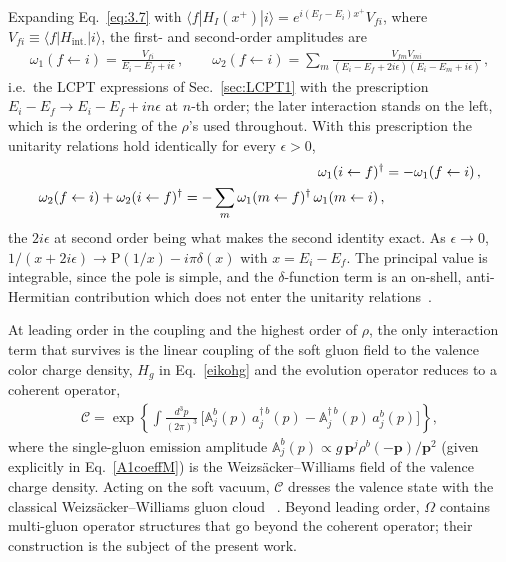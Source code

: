 \documentclass[a4paper,11pt]{article}
\def\mf#1{\mathbb{#1}}
\begin{document}
{\color{chg}Expanding Eq.~\eqref{eq:3.7} with $\langle f|H_{I}(x^{+})|i\rangle=e^{i(E_{f}-E_{i})x^{+}}V_{fi}$, where $V_{fi}\equiv\langle f|H_{\text{int.}}|i\rangle$, the first- and second-order amplitudes are
\begin{align}\label{eq:ieps}
\omega_{1}(f\leftarrow i)=\frac{V_{fi}}{E_{i}-E_{f}+i\epsilon}\,,\qquad
\omega_{2}(f\leftarrow i)=\sum_{m}\frac{V_{fm}V_{mi}}{(E_{i}-E_{f}+2i\epsilon)(E_{i}-E_{m}+i\epsilon)}\,,
\end{align}
i.e.\ the LCPT expressions of Sec.~\ref{sec:LCPT1} with the prescription $E_{i}-E_{f}\rightarrow E_{i}-E_{f}+in\epsilon$ at $n$-th order; the later interaction stands on the left, which is the ordering of the $\rho$'s used throughout. With this prescription the unitarity relations hold identically for every $\epsilon>0$,
\begin{align}
\omega_{1}(i\leftarrow f)^{\dagger}&=-\omega_{1}(f\leftarrow i)\,,\notag\\
\omega_{2}(f\leftarrow i)+\omega_{2}(i\leftarrow f)^{\dagger}=-\sum_{m}\omega_{1}(m\leftarrow f)^{\dagger}\,\omega_{1}(m\leftarrow i)\,,
\end{align}
the $2i\epsilon$ at second order being what makes the second identity exact. As $\epsilon\rightarrow0$, $1/(x+2i\epsilon)\rightarrow\mathrm{P}(1/x)-i\pi\delta(x)$ with $x=E_{i}-E_{f}$. The principal value is integrable, since the pole is simple, and the $\delta$-function term is an on-shell, anti-Hermitian contribution which does not enter the unitarity relations~\cite{munier2026unitary}.}


At leading order in the coupling and the highest order of $\rho$, the only interaction term that survives is the linear coupling of the soft gluon field to the valence color charge density, $H_{g}$ in Eq.~\eqref{eikohg} and the evolution operator reduces to a coherent operator,
\begin{align}\label{eq:coherentC}
\mathcal{C} = \exp\left\{\int \frac{d^{3}p}{(2\pi)^{3}}\,\Big[\mf{A}^{b}_{j}(p)\,a^{\dagger\, b}_{j}(p) - \mf{A}^{\dagger\, b}_{j}(p)\,a^{b}_{j}(p)\Big]\right\},
\end{align}
where the single-gluon emission amplitude $\mf{A}^{b}_{j}(p) \propto g\, \mathbf{p}^{j}\rho^{b}(-\mathbf{p})/\mathbf{p}^{2}$ (given explicitly in Eq.~\eqref{A1coeffM}) is the Weizs\"acker--Williams field of the valence charge density. Acting on the soft vacuum, $\mathcal{C}$ dresses the valence state with the classical Weizs\"acker--Williams gluon cloud ~\cite{Kovner:2005nq,kovner2019entanglement}. Beyond leading order, $\Omega$ contains multi-gluon operator structures that go beyond the coherent operator; their construction is the subject of the present work.
\end{document}
